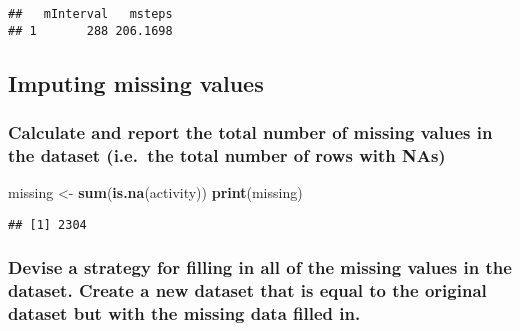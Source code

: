 \documentclass[
]{article}
\newenvironment{Shaded}{\begin{snugshade}}{\end{snugshade}}
\newcommand{\DataTypeTok}[1]{\textcolor[rgb]{0.13,0.29,0.53}{#1}}
\newcommand{\KeywordTok}[1]{\textcolor[rgb]{0.13,0.29,0.53}{\textbf{#1}}}
\newcommand{\NormalTok}[1]{#1}
\newcommand{\OperatorTok}[1]{\textcolor[rgb]{0.81,0.36,0.00}{\textbf{#1}}}
\newcommand{\StringTok}[1]{\textcolor[rgb]{0.31,0.60,0.02}{#1}}
\begin{document}
\begin{Shaded}
\end{Shaded}

\begin{verbatim}
##   mInterval   msteps
## 1       288 206.1698
\end{verbatim}

\hypertarget{imputing-missing-values}{%
\subsection{Imputing missing values}\label{imputing-missing-values}}

\hypertarget{calculate-and-report-the-total-number-of-missing-values-in-the-dataset-i.e.-the-total-number-of-rows-with-nas}{%
\subsubsection{Calculate and report the total number of missing values
in the dataset (i.e.~the total number of rows with
NAs)}\label{calculate-and-report-the-total-number-of-missing-values-in-the-dataset-i.e.-the-total-number-of-rows-with-nas}}

\begin{Shaded}
\begin{Highlighting}[]
\NormalTok{missing <-}\StringTok{ }\KeywordTok{sum}\NormalTok{(}\KeywordTok{is.na}\NormalTok{(activity))}
\KeywordTok{print}\NormalTok{(missing)}
\end{Highlighting}
\end{Shaded}

\begin{verbatim}
## [1] 2304
\end{verbatim}

\hypertarget{devise-a-strategy-for-filling-in-all-of-the-missing-values-in-the-dataset.-create-a-new-dataset-that-is-equal-to-the-original-dataset-but-with-the-missing-data-filled-in.}{%
\subsubsection{Devise a strategy for filling in all of the missing
values in the dataset. Create a new dataset that is equal to the
original dataset but with the missing data filled
in.}\label{devise-a-strategy-for-filling-in-all-of-the-missing-values-in-the-dataset.-create-a-new-dataset-that-is-equal-to-the-original-dataset-but-with-the-missing-data-filled-in.}}
\end{document}
